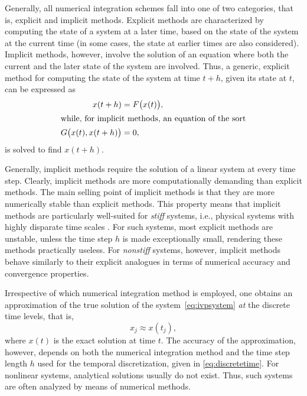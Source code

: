 Generally, all numerical integration schemes fall into one of two categories,
that is, explicit and implicit methods. Explicit methods are characterized
by computing the state of a system at a later time, based on the state of
the system at the current time (in some cases, the state at earlier times
are also considered). Implicit methods, however, involve the solution of
an equation where both the current and the later state of the system are
involved. Thus, a generic, explicit method for computing the state of the
system at time $t+h$, given its state at $t$, can be expressed as
\begin{subequations}
    \label{eq:exim}
    \begin{align}
    \label{eq:exim_ex}
    x(t+h) &= F\big(x(t)\big),\\
    \intertext{while, for implicit methods, an equation of the sort}
    \label{eq:exim_im}
    G\big(x(t),x(t+h)\big)&=0,
    \end{align}
\end{subequations}
is solved to find $x(t+h)$.

Generally, implicit methods require the solution of a linear system at every
time step. Clearly, implicit methods are more computationally demanding than
explicit methods. The main selling point of implicit methods is that they
are more numerically stable than explicit methods. This property means that
implicit methods are particularly well-suited for \emph{stiff} systems, i.e.,
physical systems with highly disparate time scales
\parencite[p.2]{hairer1996solving}. For such systems, most explicit methods
are unstable, unless the time step $h$ is made exceptionally small, rendering
these methods practically useless. For \emph{nonstiff} systems, however,
implicit methods behave similarly to their explicit analogues in terms of
numerical accuracy and convergence properties.

Irrespective of which numerical integration method is employed, one obtains
an approximation of the true solution of the system~\eqref{eq:ivpsystem}
\emph{at} the discrete time levels, that is,
\begin{equation}
    \label{eq:numericalintegratorapproximatesolution}
    x_{j} \approx x(t_{j}),
\end{equation}
where $x(t)$ is the exact solution at time $t$. The accuracy of the
approximation, however, depends on both the numerical integration method and the
time step length $h$ used for the temporal discretization, given in
\cref{eq:discretetime}. For nonlinear systems, analytical solutions usually
do not exist. Thus, such systems are often analyzed by means of numerical
methods.
